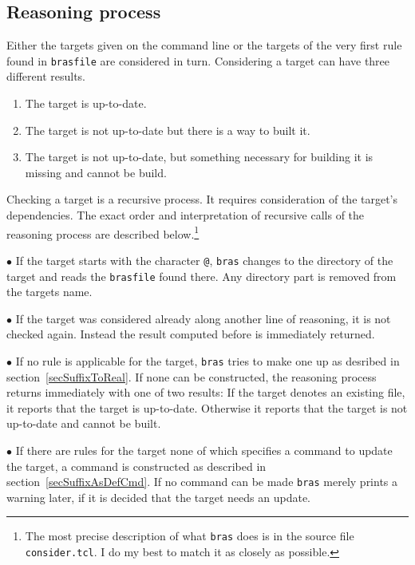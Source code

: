 \documentclass[11pt,bibtotoc,idxtotoc]{scrreprt}
\makeatletter
\newcommand{\bras}{\texttt{bras}}
\newcommand{\Indextt}[1]{\texttt{#1}\index{#1@\texttt{#1}}}
\makeatother
\begin{document}
\subsection{Reasoning process}
\label{secReasoning}
Either the targets given on the command line or the targets of the
very first rule found in \texttt{brasfile} are considered in
turn. Considering a target can have three different results. 
\begin{enumerate}
\item
The target is up-to-date.
\item
The target is not up-to-date but there is a way to built it.
\item
The target is not up-to-date, but something necessary for building it
is missing and cannot be build.
\end{enumerate}
Checking a target is a recursive process. It requires consideration of
the target's dependencies. The exact order and interpretation of
recursive calls of the reasoning process are described
below.\footnote{The most precise description of what \bras{} does is
  in the source file \Indextt{consider.tcl}. I do my best to match it
  as closely as possible.}

$\bullet$ If the target starts with the character \Indextt{@}, \bras{}
changes to the directory of the target and reads the \texttt{brasfile}
found there. Any directory part is removed from the targets name.

$\bullet$ If the target was considered already along another line of
reasoning, it is not checked again. Instead the result computed before
is immediately returned.

$\bullet$ If no rule is applicable for the target, \bras{} tries to
make one up as desribed in section~\ref{secSuffixToReal}. If none can be
constructed, the reasoning process returns immediately with one of two
results: If the target denotes an existing file, it reports that the
target is up-to-date. Otherwise it reports that the target is not
up-to-date and cannot be built.

$\bullet$ If there are rules for the target none of which specifies a
command to update the target, a command is constructed as described in
section~\ref{secSuffixAsDefCmd}. If no command can be made \bras{}
merely prints a warning later, if it is decided that the target needs
an update.

\end{document}
